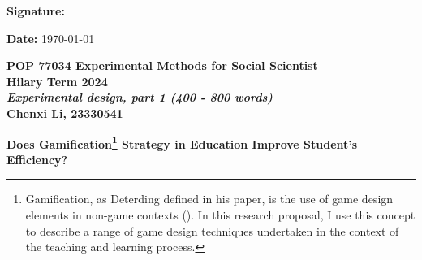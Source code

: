 \documentclass[12pt]{article} %
\begin{document}
\vspace{.7cm}


\begin{flushleft}
	\begin{minipage}{0.5\linewidth}
		\textbf{Signature:}
	\end{minipage}
\end{flushleft}

\vspace{.3cm}

\noindent \textbf{Date: } \today

\newpage
\begin{center}
	\textbf{POP 77034 Experimental Methods for Social Scientist}\\
	\textbf{Hilary Term 2024}\\
	\textbf{\textit{Experimental design, part 1 (400 - 800 words)}} \\
	\vspace{.3cm}
	\textbf{Chenxi Li, 23330541}
\end{center}

\vspace{.3cm}

\noindent \textbf{Does Gamification\footnote{Gamification, as Deterding defined in his paper, is the use of game design elements in non-game contexts (\cite{deterding2011game}). In this research proposal, I use this concept to describe a range of game design techniques undertaken in the context of the teaching and learning process.} Strategy in Education Improve Student's Efficiency?}\\
\end{document}
